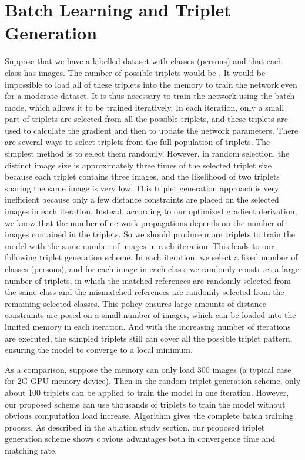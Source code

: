 \documentclass[review]{elsarticle}
\begin{document}
\section{Batch Learning and Triplet Generation}
Suppose that we have a labelled dataset with  classes (persons) and that each class has  images. The number of possible triplets would be . It would be impossible to load all of these triplets into the memory to train the network even for a moderate dataset. It is thus necessary to train the network using the batch mode, which allows it to be trained iteratively. In each iteration, only a small part of triplets are selected from all the possible triplets, and these triplets are used to calculate the gradient and then to update the network parameters. There are several ways to select triplets from the full population of triplets. The simplest method is to select them randomly. However, in random selection, the distinct image size is approximately three times of the selected triplet size because each triplet contains three images, and the likelihood of two triplets sharing the same image is very low. This triplet generation approach is very inefficient because only a few distance constraints are placed on the selected images in each iteration.  Instead, according to our optimized gradient derivation, we know that the number of network propagations depends on the number of images contained in the triplets. So we should produce more triplets to train the model with the same number of images in each iteration. This leads to our following triplet generation scheme. In each iteration, we select a fixed number of classes (persons), and for each image in each class, we randomly construct a large number of triplets, in which the matched references are randomly selected from the same class and the mismatched references are randomly selected from the remaining selected classes. This policy ensures large amounts of distance constraints are posed on a small number of images, which can be loaded into the limited memory in each iteration. And with the increasing number of iterations are executed, the sampled triplets still can cover all the possible triplet pattern, ensuring the model to converge to a local minimum. 

As a comparison, suppose the memory can only load 300 images (a typical case for 2G GPU memory device). Then in the random triplet generation scheme, only about 100 triplets can be applied to train the model in one iteration. However, our proposed scheme can use thousands of triplets to train the model without obvious computation load increase. Algorithm  gives the complete batch training process. As described in the ablation study section, our proposed triplet generation scheme shows obvious advantages both in convergence time and matching rate.
\end{document}
